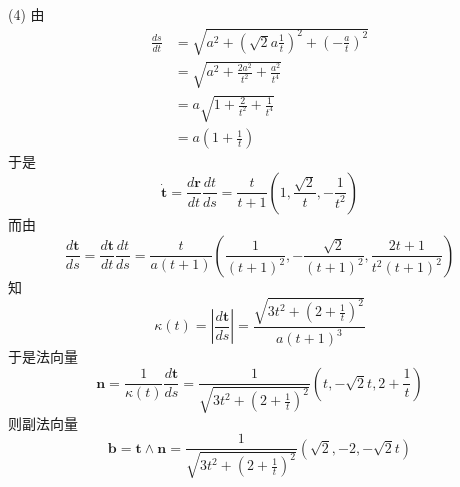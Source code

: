 \begin{tcolorbox}
	(4)
	由
	\begin{equation*}
		\begin{split}
			\frac{ds}{dt}
			&=\sqrt{a^2+\left(\sqrt{2}a\frac{1}{t}\right)^2+\left(-\frac{a}{t}\right)^2} \\
			&=\sqrt{a^2+\frac{2a^2}{t^2}+\frac{a^2}{t^4}} \\
			&=a\sqrt{1+\frac{2}{t^2}+\frac{1}{t^4}} \\
			&=a(1+\frac{1}{t})
		\end{split}
	\end{equation*}
	于是
	\begin{equation*}
		\dot{\boldsymbol{t}}=\frac{d\boldsymbol{r}}{dt}\frac{dt}{ds}
		=\frac{t}{t+1}(1,\frac{\sqrt{2}}{t},-\frac{1}{t^2})
	\end{equation*}
	而由
	\begin{equation*}
		\frac{d\boldsymbol{t}}{ds}=\frac{d\boldsymbol{t}}{dt}\frac{dt}{ds}
		=\frac{t}{a(t+1)}(\frac{1}{(t+1)^2},-\frac{\sqrt{2}}{(t+1)^2},\frac{2t+1}{t^2(t+1)^2})
	\end{equation*}
	知
	\begin{equation*}
		\kappa(t)=|\frac{d\boldsymbol{t}}{ds}|=\frac{\sqrt{3t^2+(2+\frac{1}{t})^2}}{a(t+1)^3}
	\end{equation*}
	于是法向量
	\begin{equation*}
		\boldsymbol{n}=\frac{1}{\kappa(t)}\frac{d\boldsymbol{t}}{ds}=\frac{1}{\sqrt{3t^2+(2+\frac{1}{t})^2}}(t,-\sqrt{2}t,2+\frac{1}{t})
	\end{equation*}
	则副法向量
	\begin{equation*}
		\boldsymbol{b}=\boldsymbol{t}\wedge\boldsymbol{n}=\frac{1}{\sqrt{3t^2+(2+\frac{1}{t})^2}}(\sqrt{2},-2,-\sqrt{2}t)
	\end{equation*}
\end{tcolorbox}